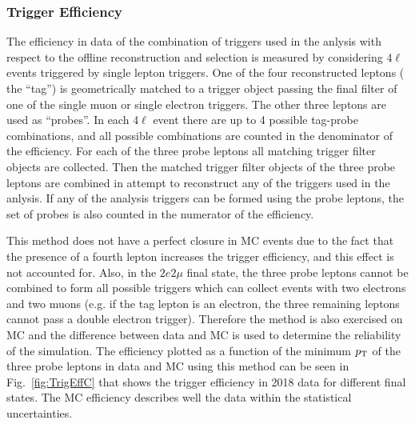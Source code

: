 \subsubsection{Trigger Efficiency}

The efficiency in data of the combination of triggers used in the anlysis with respect to the offline reconstruction and selection is measured
by considering 4$\ell$ events triggered by single lepton triggers. One of the four reconstructed leptons ( the ``tag'') is geometrically matched 
to a trigger object passing the final filter of one of the single muon or single electron triggers. The other three leptons are 
used as ``probes''. In each 4$\ell$ event there are up to 4 possible tag-probe combinations, and all possible combinations are counted in the
denominator of the efficiency. For each of the three probe leptons all matching trigger filter objects are collected. Then the matched trigger filter
objects of the three probe leptons are combined in attempt to reconstruct any of the triggers used in the anlysis. If any of the analysis triggers
can be formed using the probe leptons, the set of probes is also counted in the numerator of the efficiency.

This method does not have a perfect closure in MC events due to the fact that the presence of a fourth lepton increases the trigger efficiency,
and this effect is not accounted for. Also, in the  $2e2\mu$ final state, the three probe leptons cannot be combined to form all possible triggers which 
can collect events with two electrons and two muons (e.g. if the tag lepton is an electron, the three remaining leptons cannot pass a double electron
trigger). Therefore the method is also exercised on MC and the difference between data and MC is used to determine the reliability of the simulation.
 The efficiency plotted as a function of the minimum $p_{\rm{T}}$ of the three probe leptons in data and MC using this method can be seen in 
Fig.~\ref{fig:TrigEffC} that shows the trigger efficiency in 2018 data for different final states. The MC efficiency describes well the data within the statistical uncertainties.


